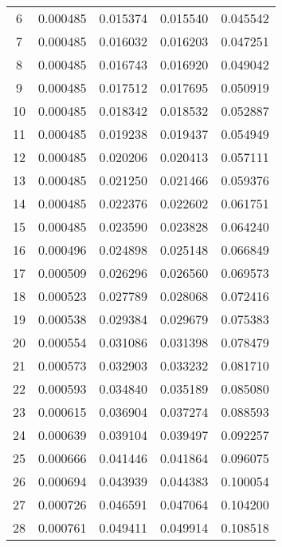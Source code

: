 \begin{center}
\begin{tabular}{|c|c|c|c|c|}
    6     & 0.000485   & 0.015374     & 0.015540     & 0.045542 \\ 
    7     & 0.000485   & 0.016032     & 0.016203     & 0.047251 \\ 
    8     & 0.000485   & 0.016743     & 0.016920     & 0.049042 \\ 
    9     & 0.000485   & 0.017512     & 0.017695     & 0.050919 \\ 
    10    & 0.000485   & 0.018342     & 0.018532     & 0.052887 \\ 
    11    & 0.000485   & 0.019238     & 0.019437     & 0.054949 \\ 
    12    & 0.000485   & 0.020206     & 0.020413     & 0.057111 \\ 
    13    & 0.000485   & 0.021250     & 0.021466     & 0.059376 \\ 
    14    & 0.000485   & 0.022376     & 0.022602     & 0.061751 \\ 
    15    & 0.000485   & 0.023590     & 0.023828     & 0.064240 \\ 
    16    & 0.000496   & 0.024898     & 0.025148     & 0.066849 \\ 
    17    & 0.000509   & 0.026296     & 0.026560     & 0.069573 \\ 
    18    & 0.000523   & 0.027789     & 0.028068     & 0.072416 \\ 
    19    & 0.000538   & 0.029384     & 0.029679     & 0.075383 \\ 
    20    & 0.000554   & 0.031086     & 0.031398     & 0.078479 \\ 
    21    & 0.000573   & 0.032903     & 0.033232     & 0.081710 \\ 
    22    & 0.000593   & 0.034840     & 0.035189     & 0.085080 \\ 
    23    & 0.000615   & 0.036904     & 0.037274     & 0.088593 \\ 
    24    & 0.000639   & 0.039104     & 0.039497     & 0.092257 \\ 
    25    & 0.000666   & 0.041446     & 0.041864     & 0.096075 \\ 
    26    & 0.000694   & 0.043939     & 0.044383     & 0.100054 \\ 
    27    & 0.000726   & 0.046591     & 0.047064     & 0.104200 \\ 
    28    & 0.000761   & 0.049411     & 0.049914     & 0.108518 \\ 

\end{tabular}
\end{center}
